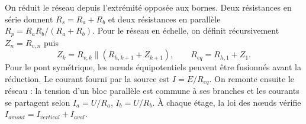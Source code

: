 \begin{corrigebox}
On réduit le réseau depuis l'extrémité opposée aux bornes. Deux
            résistances en série donnent $R_s=R_a+R_b$ et deux résistances en parallèle
            $R_p=R_aR_b/(R_a+R_b)$. Pour le réseau en échelle, on définit récursivement
            $Z_{n}=R_{v,n}$ puis
            \[Z_k=R_{v,k}\parallel(R_{h,k+1}+Z_{k+1}),\qquad
              R_{eq}=R_{h,1}+Z_1.\]
            Pour le pont symétrique, les nœuds équipotentiels peuvent être fusionnés avant
            la réduction.
Le courant fourni par la source est $I=E/R_{eq}$. On
            remonte ensuite le réseau : la tension d'un bloc parallèle est commune à ses
            branches et les courants se partagent selon
            $I_a=U/R_a$, $I_b=U/R_b$. À chaque étage, la loi des nœuds vérifie
            $I_{amont}=I_{vertical}+I_{aval}$.
\end{corrigebox}
